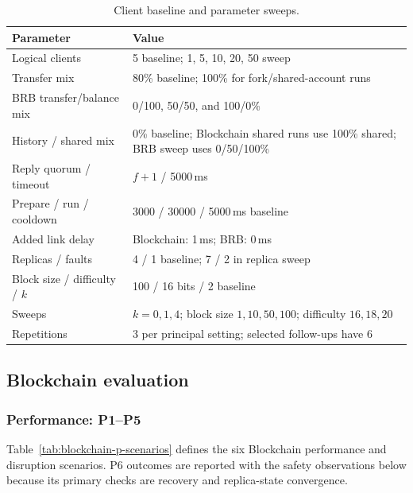 \documentclass[sigconf,a4paper]{acmart}
\begin{document}
    \begin{table}[t]
        \centering
        \small
        \caption{Client baseline and parameter sweeps.}
        \label{tab:params}
        \begin{tabular}{p{2.6cm}p{4.4cm}}
            \toprule
            \textbf{Parameter} & \textbf{Value} \\
            \midrule
            Logical clients & 5 baseline; 1, 5, 10, 20, 50 sweep \\
            Transfer mix & 80\% baseline; 100\% for fork/shared-account runs \\
            BRB transfer/balance mix & 0/100, 50/50, and 100/0\% \\
            History / shared mix & 0\% baseline; Blockchain shared runs use 100\% shared; BRB sweep uses 0/50/100\% \\
            Reply quorum / timeout & $f+1$ / 5000\,ms \\
            Prepare / run / cooldown & 3000 / 30000 / 5000\,ms baseline \\
            Added link delay & Blockchain: 1\,ms; BRB: 0\,ms \\
            Replicas / faults & 4 / 1 baseline; 7 / 2 in replica sweep \\
            Block size / difficulty / $k$ & 100 / 16 bits / 2 baseline \\
            Sweeps & $k=0,1,4$; block size $1,10,50,100$; difficulty $16,18,20$ \\
            Repetitions & 3 per principal setting; selected follow-ups have 6 \\
            \bottomrule
        \end{tabular}
    \end{table}

    \subsection{Blockchain evaluation}
    \label{subsec:eval-blockchain}
    \subsubsection{Performance: P1--P5}

    Table~\ref{tab:blockchain-p-scenarios} defines the six Blockchain
    performance and disruption scenarios. P6 outcomes are reported with the
    safety observations below because its primary checks are recovery and
    replica-state convergence.
\end{document}
